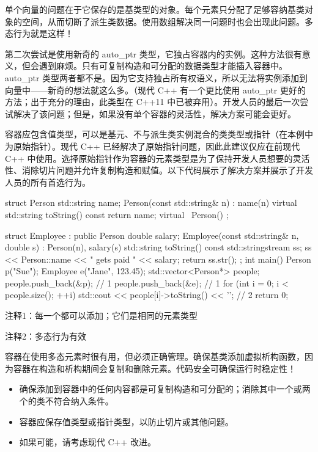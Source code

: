 单个向量的问题在于它保存的是基类型的对象。每个元素只分配了足够容纳基类对象的空间，从而切断了派生类数据。使用数组解决同一问题时也会出现此问题。多态行为就是这样！

第二次尝试是使用新奇的 auto\_ptr 类型，它独占容器内的实例。这种方法很有意义，但会遇到麻烦。只有可复制构造和可分配的数据类型才能插入容器中。auto\_ptr 类型两者都不是。因为它支持独占所有权语义，所以无法将实例添加到向量中——新奇的想法就这么多。（现代 C++ 有一个更比使用 auto\_ptr 更好的方法；出于充分的理由，此类型在 C++11 中已被弃用）。开发人员的最后一次尝试解决了该问题；但是，如果没有单个容器的灵活性，解决方案可能会更好。


容器应包含值类型，可以是基元、不与派生类实例混合的类类型或指针（在本例中为原始指针）。现代 C++ 已经解决了原始指针问题，因此此建议仅应在前现代 C++ 中使用。选择原始指针作为容器的元素类型是为了保持开发人员想要的灵活性、消除切片问题并允许复制构造和赋值。以下代码展示了解决方案并展示了开发人员的所有首选行为。


\begin{cpp}
struct Person {
  std::string name;
  Person(const std::string& n) : name(n) {}
  virtual std::string toString() const { return name; }
  virtual ~Person() {}
};

struct Employee : public Person {
  double salary;
  Employee(const std::string& n, double s) : Person(n), salary(s) {}
  std::string toString() const {
    std::stringstream ss;
    ss << Person::name << " gets paid " << salary;
    return ss.str();
  }
};
int main() {
  Person p("Sue");
  Employee e("Jane", 123.45);
  std::vector<Person*> people;
  people.push_back(&p); // 1
  people.push_back(&e); // 1
  for (int i = 0; i < people.size(); ++i)
    std::cout << people[i]->toString() << '\n'; // 2
  return 0;
}
\end{cpp}

{\footnotesize
注释1：每一个都可以添加；它们是相同的元素类型

注释2：多态行为有效
}

容器在使用多态元素时很有用，但必须正确管理。确保基类添加虚拟析构函数，因为容器在构造和析构期间会复制和删除元素。代码安全可确保运行时稳定性！


\begin{itemize}
\item
确保添加到容器中的任何内容都是可复制构造和可分配的；消除其中一个或两个的类不符合纳入条件。

\item
容器应保存值类型或指针类型，以防止切片或其他问题。

\item
如果可能，请考虑现代 C++ 改进。
\end{itemize}










